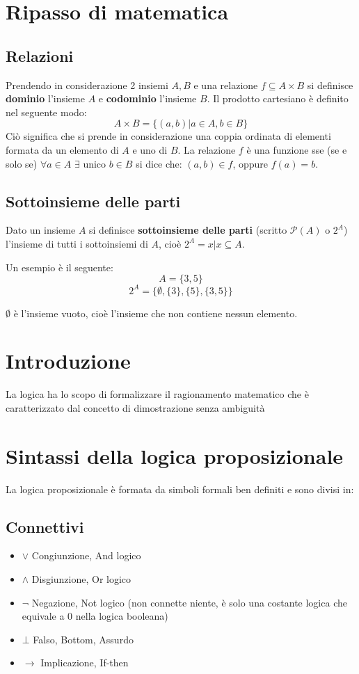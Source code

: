 \documentclass{article}
\theoremstyle{break}
\theoremstyle{break}
\theoremstyle{break}
\theoremstyle{break}
\begin{document}


\tableofcontents
\pagebreak

\section{Ripasso di matematica}
\subsection{Relazioni}
Prendendo in considerazione 2 insiemi \( A, B \) e una relazione \( f \subseteq A\times B \)
si definisce \textbf{dominio} l'insieme \( A \) e \textbf{codominio} l'insieme \( B \).
Il prodotto cartesiano è definito nel seguente modo:
\[
	A \times B = \{(a,b) | a \in A, b \in B\}
\]
Ciò significa che si prende in considerazione una coppia ordinata di elementi formata da
un elemento di \( A \) e uno di \( B \).
La relazione \( f \) è una funzione sse (se e solo se) \( \forall a \in A \) \( \exists \) unico \( b \in B \)
si dice che: \( (a,b) \in f \), oppure \( f(a) = b \).

\subsection{Sottoinsieme delle parti}
Dato un insieme \( A \) si definisce \textbf{sottoinsieme delle parti} (scritto \( \mathcal{P}(A) \) o \( 2^{A} \))
l'insieme di tutti i sottoinsiemi di \( A \), cioè \( 2^{A} = {x|x \subseteq A} \).

Un esempio è il seguente:
\[
	A = \{3, 5\}
\]
\[
	2^{A} = \{ \emptyset, \{3\}, \{5\}, \{3,5\} \}
\]

\( \emptyset \) è l'insieme vuoto, cioè l'insieme che non contiene nessun elemento.

\section{Introduzione}
La logica ha lo scopo di formalizzare il ragionamento matematico
che è caratterizzato dal concetto di dimostrazione senza ambiguità

\section{Sintassi della logica proposizionale}
La logica proposizionale è formata da simboli formali ben definiti
e sono divisi in:
\subsection{Connettivi}
\begin{itemize}
	\item \( \vee \) Congiunzione, And logico
	\item \( \wedge \) Disgiunzione, Or logico
	\item \( \neg \) Negazione, Not logico (non connette niente, è solo una costante logica
	      che equivale a 0 nella logica booleana)
	\item \( \bot \) Falso, Bottom, Assurdo
	\item \( \to  \) Implicazione, If-then
\end{itemize}
\end{document}
